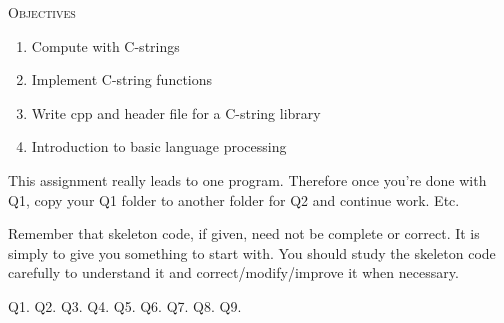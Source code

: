 


\renewcommand\TITLE{Assignment 3}


\topmatter

\textsc{Objectives}
 \begin{enumerate}
 \item Compute with C-strings
 \item Implement C-string functions
 \item Write cpp and header file for a C-string library
 \item Introduction to basic language processing
 \end{enumerate}


This assignment really leads to one program.
Therefore once you're done with Q1, copy your Q1 folder to another folder for
Q2 and
continue work. Etc.

Remember that skeleton code, if given, need not be complete or correct.
It is simply to give you something to start with.
You should study the skeleton code carefully to understand it
and correct/modify/improve it when necessary.

\newpage
\newpage
\newpage

\newpage Q1. 
\newpage Q2. 
\newpage Q3. 
\newpage Q4. 
\newpage Q5. 
\newpage Q6. 
\newpage Q7. 
\newpage Q8. 
\newpage Q9. 


